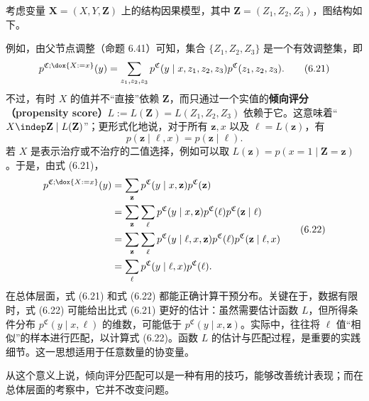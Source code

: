 \begin{remark}[倾向评分匹配]
考虑变量 $\mathbf X=(X,Y,\mathbf Z)$ 上的结构因果模型，其中 $\mathbf Z=(Z_1,Z_2,Z_3)$，图结构如下。

例如，由父节点调整（命题 6.41）可知，集合 $\{Z_1,Z_2,Z_3\}$ 是一个有效调整集，即
\begin{equation}
 p^{\mathfrak C;\dox{X:=x}}(y)
 =\sum_{z_1,z_2,z_3}p^{\mathfrak C}(y\mid x,z_1,z_2,z_3)
 p^{\mathfrak C}(z_1,z_2,z_3).
 \tag{6.21}
\end{equation}
不过，有时 $X$ 的值并不“直接”依赖 $\mathbf Z$，而只通过一个实值的\textbf{倾向评分（propensity score）}$L:=L(\mathbf Z)=L(Z_1,Z_2,Z_3)$ 依赖于它。这意味着“$X\indep\mathbf Z\mid L(\mathbf Z)$”；更形式化地说，对于所有 $\mathbf z,x$ 以及 $\ell=L(\mathbf z)$，有
\[
 p(\mathbf z\mid\ell,x)=p(\mathbf z\mid\ell).
\]
若 $X$ 是表示治疗或不治疗的二值选择，例如可以取 $L(\mathbf z)=p(x=1\mid\mathbf Z=\mathbf z)$。于是，由式 (6.21)，
\begin{equation}
 \begin{aligned}
 p^{\mathfrak C;\dox{X:=x}}(y)
 &=\sum_{\mathbf z}p^{\mathfrak C}(y\mid x,\mathbf z)p^{\mathfrak C}(\mathbf z)\\
 &=\sum_{\mathbf z}\sum_{\ell}p^{\mathfrak C}(y\mid x,\mathbf z)
 p^{\mathfrak C}(\ell)p^{\mathfrak C}(\mathbf z\mid\ell)\\
 &=\sum_{\mathbf z}\sum_{\ell}p^{\mathfrak C}(y\mid\ell,x,\mathbf z)
 p^{\mathfrak C}(\ell)p^{\mathfrak C}(\mathbf z\mid\ell,x)\\
 &=\sum_{\ell}p^{\mathfrak C}(y\mid\ell,x)p^{\mathfrak C}(\ell).
 \end{aligned}
 \tag{6.22}
\end{equation}
在总体层面，式 (6.21) 和式 (6.22) 都能正确计算干预分布。关键在于，数据有限时，式 (6.22) 可能给出比式 (6.21) 更好的估计：虽然需要估计函数 $L$，但所得条件分布 $p^{\mathfrak C}(y\mid x,\ell)$ 的维数，可能低于 $p^{\mathfrak C}(y\mid x,\mathbf z)$。实际中，往往将 $\ell$ 值“相似”的样本进行匹配，以计算式 (6.22)。函数 $L$ 的估计与匹配过程，是重要的实践细节。这一思想适用于任意数量的协变量。

从这个意义上说，倾向评分匹配可以是一种有用的技巧，能够改善统计表现；而在总体层面的考察中，它并不改变问题。
\end{remark}
\FloatBarrier
